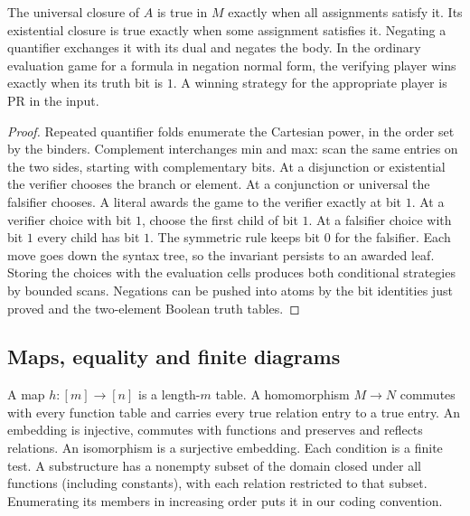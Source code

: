 \begin{corollary}
The universal closure of $A$ is true in $M$ exactly when all assignments satisfy it. Its existential closure is true exactly when some assignment satisfies it. Negating a quantifier exchanges it with its dual and negates the body. In the ordinary evaluation game for a formula in negation normal form, the verifying player wins exactly when its truth bit is $1$. A winning strategy for the appropriate player is PR in the input.
\end{corollary}
\begin{proof}
Repeated quantifier folds enumerate the Cartesian power, in the order set by the binders. Complement interchanges min and max: scan the same entries on the two sides, starting with complementary bits. At a disjunction or existential the verifier chooses the branch or element. At a conjunction or universal the falsifier chooses. A literal awards the game to the verifier exactly at bit $1$. At a verifier choice with bit $1$, choose the first child of bit $1$. At a falsifier choice with bit $1$ every child has bit $1$. The symmetric rule keeps bit $0$ for the falsifier. Each move goes down the syntax tree, so the invariant persists to an awarded leaf. Storing the choices with the evaluation cells produces both conditional strategies by bounded scans. Negations can be pushed into atoms by the bit identities just proved and the two-element Boolean truth tables.
\end{proof}

\subsection{Maps, equality and finite diagrams}
A map $h:[m]\to[n]$ is a length-$m$ table. A homomorphism $M\to N$ commutes with every function table and carries every true relation entry to a true entry. An embedding is injective, commutes with functions and preserves and reflects relations. An isomorphism is a surjective embedding. Each condition is a finite test. A substructure has a nonempty subset of the domain closed under all functions (including constants), with each relation restricted to that subset. Enumerating its members in increasing order puts it in our coding convention.

